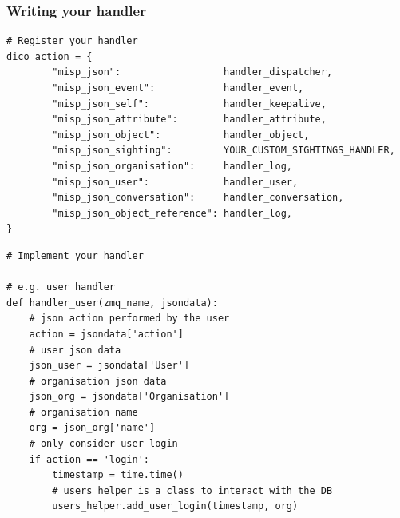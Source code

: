 

\lstset{style=code,language=python}
\begin{frame}[fragile]
    \frametitle{Writing your handler}
    \begin{lstlisting}
# Register your handler
dico_action = {
        "misp_json":                  handler_dispatcher,
        "misp_json_event":            handler_event,
        "misp_json_self":             handler_keepalive,
        "misp_json_attribute":        handler_attribute,
        "misp_json_object":           handler_object,
        "misp_json_sighting":         YOUR_CUSTOM_SIGHTINGS_HANDLER,
        "misp_json_organisation":     handler_log,
        "misp_json_user":             handler_user,
        "misp_json_conversation":     handler_conversation,
        "misp_json_object_reference": handler_log,
}
    \end{lstlisting}
\end{frame}

\begin{frame}[fragile]
    \begin{lstlisting}
# Implement your handler

# e.g. user handler
def handler_user(zmq_name, jsondata):
    # json action performed by the user
    action = jsondata['action']
    # user json data
    json_user = jsondata['User']
    # organisation json data
    json_org = jsondata['Organisation']
    # organisation name
    org = json_org['name']
    # only consider user login
    if action == 'login':
        timestamp = time.time()
        # users_helper is a class to interact with the DB
        users_helper.add_user_login(timestamp, org)
    \end{lstlisting}
\end{frame}


